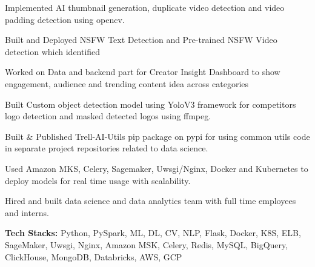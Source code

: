 \begin{cventries}
{\begin{cvitems}
        \item {Implemented AI thumbnail generation, duplicate video detection and video padding detection using opencv.}
        \item {Built and Deployed NSFW Text Detection and Pre-trained NSFW Video detection which identified }
        \item {Worked on Data and backend part for Creator Insight Dashboard to show engagement, audience and trending content idea across categories}
        \item {Built Custom object detection model using YoloV3 framework for competitors logo detection and masked detected logos using ffmpeg.}
        \item {Built \& Published Trell-AI-Utils pip package on pypi for using common utils code in separate project repositories related to data science.}
        \item {Used Amazon MKS, Celery, Sagemaker, Uwsgi/Nginx, Docker and Kubernetes to deploy models for real time usage with scalability.}
        \item {Hired and built data science and data analytics team with full time employees and interns.}
        \item {\textbf{Tech Stacks:} Python, PySpark, ML, DL, CV, NLP, Flask, Docker, K8S, ELB, SageMaker, Uwsgi, Nginx, Amazon MSK, Celery, Redis, MySQL, BigQuery, ClickHouse, MongoDB, Databricks, AWS, GCP}
      \end{cvitems}
    }


\end{cventries}
